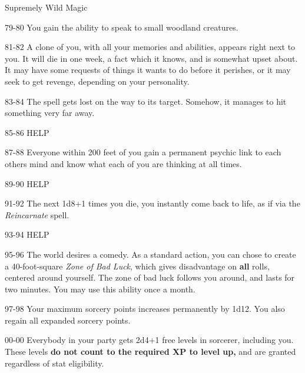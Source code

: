 \begin{rolltable}[0.6\textheight/0pt]{Supremely Wild Magic}
\item[79-80] You gain the ability to speak to small woodland creatures.
\item[81-82] A clone of you, with all your memories and abilities, appears right next to you.
It will die in one week, a fact which it knows, and is somewhat upset about.
It may have some requests of things it wants to do before it perishes, or it may seek to get revenge, depending on your personality.
\item[83-84] The spell gets lost on the way to its target.
Somehow, it manages to hit something very far away.
\item[85-86] HELP
\item[87-88] Everyone within 200 feet of you gain a permanent psychic link to each others mind and know what each of you are thinking at all times.
\item[89-90] HELP
\item[91-92] The next 1d8+1 times you die, you instantly come back to life, as if via the \textit{Reincarnate} spell. 
\item[93-94] HELP
\item[95-96] The world desires a comedy.
As a standard action, you can chose to create a 40-foot-square \textit{Zone of Bad Luck}, which gives disadvantage on \textbf{all} rolls, centered around yourself.
The zone of bad luck follows you around, and lasts for two minutes.
You may use this ability once a month.
\item[97-98] Your maximum sorcery points increases permanently by 1d12.
You also regain all expanded sorcery points.
\item[00-00] Everybody in your party gets 2d4+1 free levels in sorcerer, including you. These levels \textbf{do not count to the required XP to level up,} and are granted regardless of stat eligibility.

\end{rolltable}

